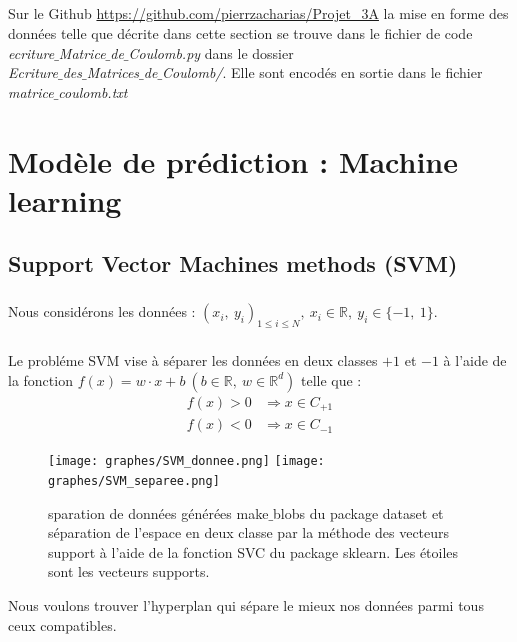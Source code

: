 \documentclass[a4paper,12pt,titlepage]{report}
\begin{document}
\paragraph{}
Sur le Github \url{https://github.com/pierrzacharias/Projet_3A} la mise en 
forme des données telle que décrite dans cette section se trouve dans le 
fichier de code \textit{ecriture{$\_$}Matrice{$\_$}de{$\_$}Coulomb.py} dans le dossier \\
\textit{Ecriture{$\_$}des{$\_$}Matrices{$\_$}de{$\_$}Coulomb/}. Elle sont encodés en sortie 
dans le fichier \textit{matrice{$\_$}coulomb.txt}
\chapter{Modèle de prédiction : Machine learning}
\label{C1}
\section{Support Vector Machines methods (SVM)}
\paragraph{}
Nous considérons les données : $(x_{i},\ y_{i})_{1 \leqslant i \leqslant N},\ x_{i} \in \mathbb{R}, \ y_{i} \in \{-1,\ 1\}$.
\paragraph{}
Le probléme SVM vise à séparer les données  en deux classes $+1$ et $-1$ à l'aide de la fonction $f(x) = w \cdot x + b \ (b \in \mathbb{R},\ w \in  \mathbb{R}^{d})$ telle que :
\[ \begin{aligned}
	f(x) > 0 &\Rightarrow x \in C_{+1} \\
	f(x) < 0 &\Rightarrow x \in C_{-1} 
	\end{aligned}
\]

\begin{figure}[!h]
	\begin{center}
	\centering	
		\texttt{[image: graphes/SVM\_donnee.png]}
		\texttt{[image: graphes/SVM\_separee.png]}
		\caption{sparation de données générées make$\_$blobs du package dataset et séparation de l'espace en deux classe par la méthode des vecteurs support à l'aide de la fonction SVC du package sklearn. Les étoiles sont les vecteurs supports.}
	\end{center}
\end{figure}
Nous voulons trouver l'hyperplan qui sépare le mieux nos données parmi tous ceux compatibles.
\end{document}
